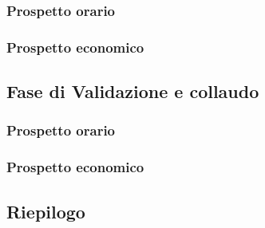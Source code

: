 \subsubsection{Prospetto orario}

\subsubsection{Prospetto economico}

\subsection{Fase di Validazione e collaudo}
\subsubsection{Prospetto orario}

\subsubsection{Prospetto economico}

\subsection{Riepilogo}